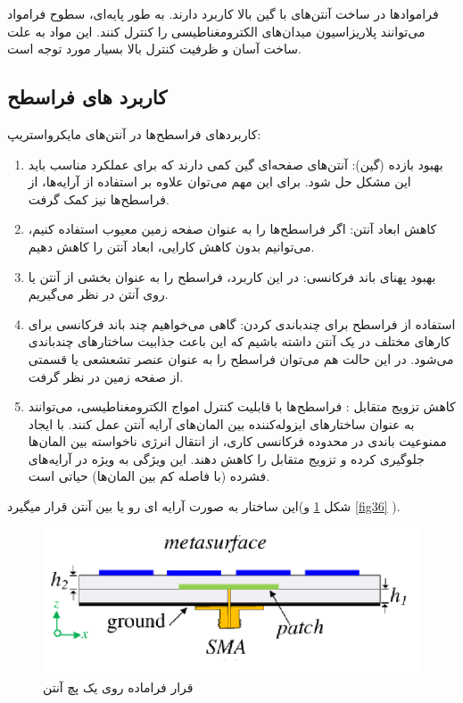 فراموادها در ساخت آنتن‌های با گین بالا کاربرد دارند. به طور پایه‌ای، سطوح فرامواد
 می‌توانند پلاریزاسیون میدان‌های الکترومغناطیسی را کنترل کنند.
این مواد به علت ساخت آسان و ظرفیت کنترل بالا بسیار مورد توجه است.

\subsection{کاربرد های فراسطح}
 کاربردهای فراسطح‌ها در آنتن‌های مایکرواستریپ:
\begin{enumerate}
	\item{
	بهبود بازده (گین): آنتن‌های صفحه‌ای گین کمی دارند که برای عملکرد مناسب باید این مشکل حل شود. برای این مهم می‌توان علاوه بر استفاده از آرایه‌ها، از فراسطح‌ها نیز کمک گرفت.
	}
	\item{
	کاهش ابعاد آنتن: اگر فراسطح‌ها را به عنوان صفحه زمین معیوب
	 استفاده کنیم، می‌توانیم بدون کاهش کارایی، ابعاد آنتن را کاهش دهیم.
	}
	\item{
	بهبود پهنای باند فرکانسی: در این کاربرد، فراسطح را به عنوان بخشی از آنتن یا روی آنتن در نظر می‌گیریم.
	}
	\item{
	استفاده از فراسطح برای چندباندی کردن: گاهی می‌خواهیم چند باند فرکانسی برای کارهای مختلف در یک آنتن داشته باشیم که این باعث جذابیت ساختارهای چندباندی می‌شود. در این حالت هم می‌توان فراسطح را به عنوان عنصر تشعشعی یا قسمتی از صفحه زمین در نظر گرفت.
	}
	\item{
	کاهش تزویج متقابل : فراسطح‌ها با قابلیت کنترل امواج الکترومغناطیسی، می‌توانند به عنوان ساختارهای ایزوله‌کننده بین المان‌های آرایه آنتن عمل کنند. با ایجاد ممنوعیت باندی
	 در محدوده فرکانسی کاری، از انتقال انرژی ناخواسته بین المان‌ها جلوگیری کرده و تزویج متقابل را کاهش دهند. این ویژگی به ویژه در آرایه‌های فشرده (با فاصله کم بین المان‌ها) حیاتی است.
	}
\end{enumerate}

این ساختار به صورت آرایه ای رو یا بین آنتن قرار میگیرد(شکل
\ref{fig35}
و
\ref{fig36}
).

\begin{figure}
	\centering
	\includegraphics[scale=0.5]{Images/fig35.png}
	\caption{قرار فراماده روی یک پچ آنتن}
	\label{fig35}
\end{figure}

